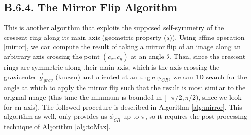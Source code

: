 \documentclass[11pt, a4paper, twoside]{article} %
\begin{document}
\vspace{-0.35cm}
\subsection*{B.6.4. The Mirror Flip Algorithm}\vspace{-0.15cm}
This is another algorithm that exploits the supposed self-symmetry of the crescent ring along its main axis (geometric property (a)). Using affine operation \eqref{mirror}, we can compute the result of taking a mirror flip of an image along an arbitrary axis crossing the point $(c_x,c_y)$ at an angle $\theta$. Then, since the crescent rings are symmetric along their main axis, which is the axis crossing the gravicenter $\vec{g}_{grav}$ (known) and oriented at an angle $\phi_{CR}$, we can 1D search for the angle at which to apply the mirror flip such that the result is most similar to the original image (this time the minimum is bounded in $[-\pi/2,\pi/2)$, since we look for an axis). The followed procedure is described in Algorithm \ref{alg:mirror}. This algorithm as well, only provides us $\phi_{CR}$ up to $\pi$, so it requires the post-processing technique of Algorithm \ref{alg:toMax}.
\end{document}
